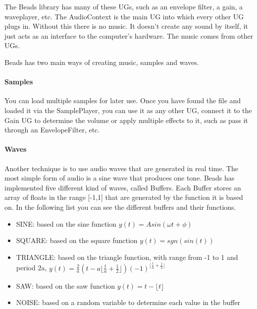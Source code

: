 \documentclass[12pt]{article}
\newcommand\floor[1]{\lfloor#1\rfloor}
\begin{document}
The Beads library has many of these UGs, such as an envelope filter, a gain, a waveplayer, etc. The AudioContext is the main UG into which every other UG plugs in. Without this there is no music. It doesn't create any sound by itself, it just acts as an interface to the computer's hardware. The music comes from other UGs.
\newline

Beads has two main ways of creating music, samples and waves.

\paragraph{Samples}

You can load multiple samples for later use. Once you have found the file and loaded it via the SamplePlayer, you can use it as any other UG, connect it to the Gain UG to determine the volume or apply multiple effects to it, such as pass it through an EnvelopeFilter, etc.  

\paragraph{Waves}

Another technique is to use audio waves that are generated in real time. The most simple form of audio is a sine wave that produces one tone. Beads has implemented five different kind of waves, called Buffers. Each Buffer stores an array of floats in the range [-1,1] that are generated by the function it is based on. In the following list you can see the different buffers and their functions.
\begin{itemize}
\item SINE:  based on the sine function $y(t) = A sin (\omega t + \phi)$
\item SQUARE: based on the square function $y(t) = sgn(sin(t))$
\item TRIANGLE: based on the triangle function, with range from -1 to 1 and period 2a, $y(t) = \frac{2}{a}(t - a \floor{\frac{t}{a} + \frac{1}{2}}) (-1)^{\floor{\frac{t}{a} + \frac{1}{2}}}$
\item SAW: based on the saw function $y(t) = t - \floor{t}$
\item NOISE: based on a random variable to determine each value in the buffer
\end{itemize} 
\end{document}
